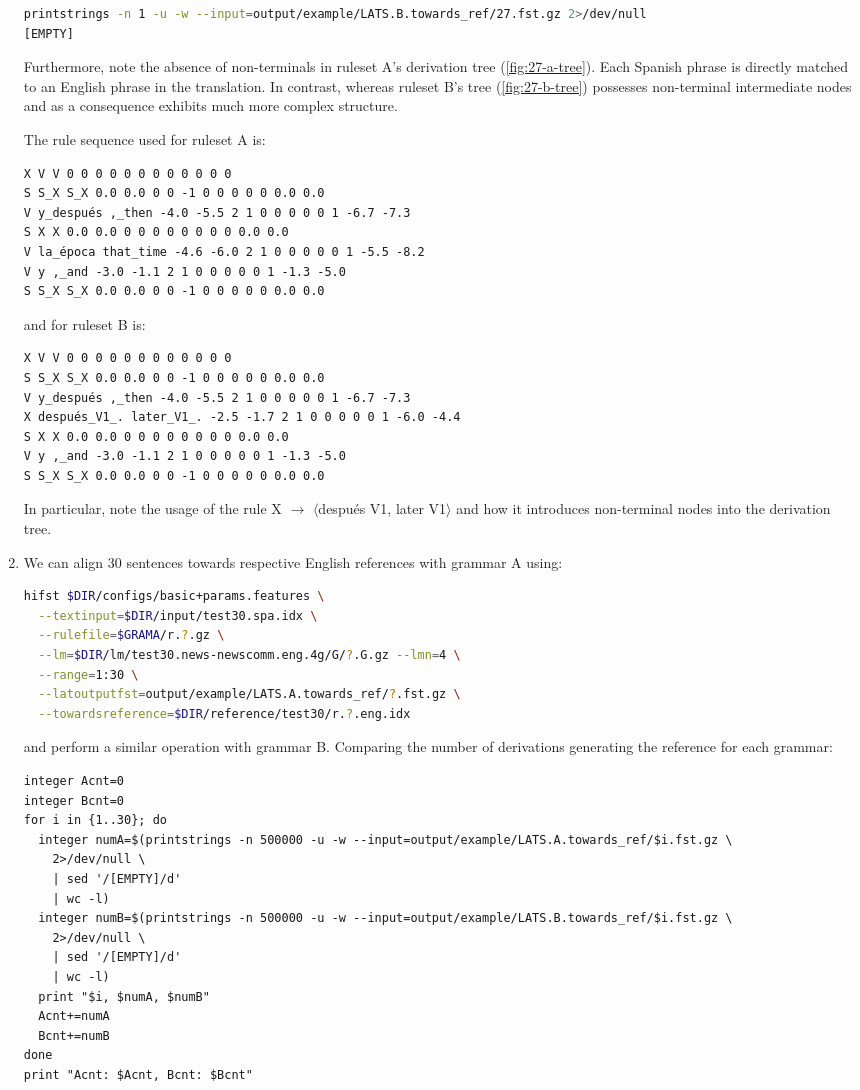 \documentclass[a4paper,oneside,reqno]{amsart}
\begin{document}
\begin{enumerate}[label=\arabic*.]
\begin{lstlisting}[language=bash]
printstrings -n 1 -u -w --input=output/example/LATS.B.towards_ref/27.fst.gz 2>/dev/null
[EMPTY]
    \end{lstlisting}

    Furthermore, note the absence of non-terminals in ruleset A's derivation
    tree (\autoref{fig:27-a-tree}). Each Spanish phrase is directly matched to
    an English phrase in the translation. In contrast, whereas ruleset B's tree
    (\autoref{fig:27-b-tree}) possesses non-terminal intermediate nodes and as
    a consequence exhibits much more complex structure.

    The rule sequence used for ruleset A is:
    \begin{verbatim}
X V V 0 0 0 0 0 0 0 0 0 0 0 0
S S_X S_X 0.0 0.0 0 0 -1 0 0 0 0 0 0.0 0.0
V y_después ,_then -4.0 -5.5 2 1 0 0 0 0 0 1 -6.7 -7.3
S X X 0.0 0.0 0 0 0 0 0 0 0 0 0.0 0.0
V la_época that_time -4.6 -6.0 2 1 0 0 0 0 0 1 -5.5 -8.2
V y ,_and -3.0 -1.1 2 1 0 0 0 0 0 1 -1.3 -5.0
S S_X S_X 0.0 0.0 0 0 -1 0 0 0 0 0 0.0 0.0
    \end{verbatim}
    and for ruleset B is:
    \begin{verbatim}
X V V 0 0 0 0 0 0 0 0 0 0 0 0
S S_X S_X 0.0 0.0 0 0 -1 0 0 0 0 0 0.0 0.0
V y_después ,_then -4.0 -5.5 2 1 0 0 0 0 0 1 -6.7 -7.3
X después_V1_. later_V1_. -2.5 -1.7 2 1 0 0 0 0 0 1 -6.0 -4.4
S X X 0.0 0.0 0 0 0 0 0 0 0 0 0.0 0.0
V y ,_and -3.0 -1.1 2 1 0 0 0 0 0 1 -1.3 -5.0
S S_X S_X 0.0 0.0 0 0 -1 0 0 0 0 0 0.0 0.0
    \end{verbatim}
    In particular, note the usage of the rule X $\to$ $\langle$después V1,
    later V1$\rangle$ and how it introduces non-terminal nodes into
    the derivation tree.

  \item We can align 30 sentences towards respective English references
    with grammar A using:
    \begin{lstlisting}[language=bash]
hifst $DIR/configs/basic+params.features \
  --textinput=$DIR/input/test30.spa.idx \
  --rulefile=$GRAMA/r.?.gz \
  --lm=$DIR/lm/test30.news-newscomm.eng.4g/G/?.G.gz --lmn=4 \
  --range=1:30 \
  --latoutputfst=output/example/LATS.A.towards_ref/?.fst.gz \
  --towardsreference=$DIR/reference/test30/r.?.eng.idx
    \end{lstlisting}
    and perform a similar operation with grammar B.
    Comparing the number of derivations generating the reference for each
    grammar:

    \begin{lstlisting}
integer Acnt=0
integer Bcnt=0
for i in {1..30}; do
  integer numA=$(printstrings -n 500000 -u -w --input=output/example/LATS.A.towards_ref/$i.fst.gz \
    2>/dev/null \
    | sed '/[EMPTY]/d'
    | wc -l)
  integer numB=$(printstrings -n 500000 -u -w --input=output/example/LATS.B.towards_ref/$i.fst.gz \
    2>/dev/null \
    | sed '/[EMPTY]/d'
    | wc -l)
  print "$i, $numA, $numB"
  Acnt+=numA
  Bcnt+=numB
done
print "Acnt: $Acnt, Bcnt: $Bcnt"
    \end{lstlisting}


\end{enumerate}
\end{document}
